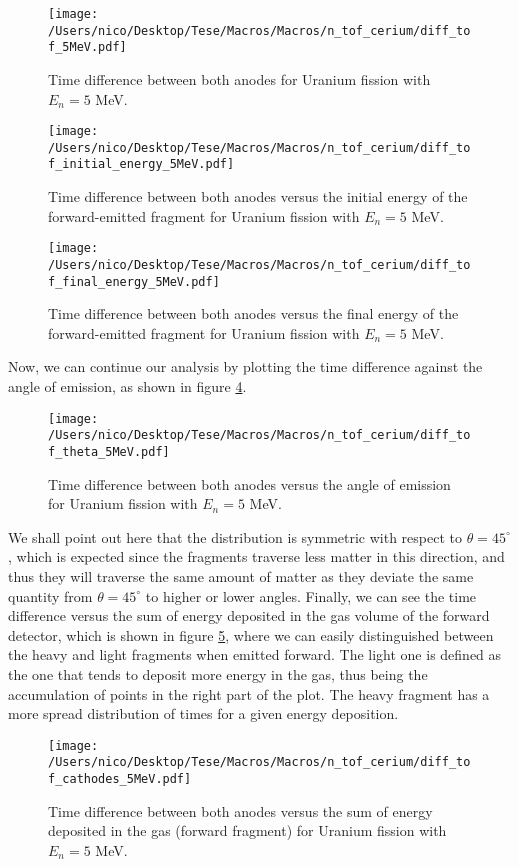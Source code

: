 \documentclass{article}
\begin{document}
\begin{figure}[H]
    \centering
    \texttt{[image: /Users/nico/Desktop/Tese/Macros/Macros/n\_tof\_cerium/diff\_tof\_5MeV.pdf]}
    \caption{Time difference between both anodes for Uranium fission with $E_n=5$ MeV.}
    \label{fig:diff_tof_5MeV}
\end{figure}
\begin{figure}[H]
    \centering
    \texttt{[image: /Users/nico/Desktop/Tese/Macros/Macros/n\_tof\_cerium/diff\_tof\_initial\_energy\_5MeV.pdf]}
    \caption{Time difference between both anodes versus the initial energy of the forward-emitted fragment for Uranium fission with $E_n=5$ MeV.}
    \label{fig:time_diff_initial_energy_5MeV}
\end{figure}
\begin{figure}
    \centering
    \texttt{[image: /Users/nico/Desktop/Tese/Macros/Macros/n\_tof\_cerium/diff\_tof\_final\_energy\_5MeV.pdf]}
    \caption{Time difference between both anodes versus the final energy of the forward-emitted fragment for Uranium fission with $E_n=5$ MeV.}
    \label{fig:time_diff_final_energy_5MeV}
\end{figure}
Now, we can continue our analysis by plotting the time difference against the angle of emission, as shown in figure \ref{fig:time_diff_costheta_5MeV}.
\begin{figure}[H]
    \centering
    \texttt{[image: /Users/nico/Desktop/Tese/Macros/Macros/n\_tof\_cerium/diff\_tof\_theta\_5MeV.pdf]}
    \caption{Time difference between both anodes versus the angle of emission for Uranium fission with $E_n=5$ MeV.}
    \label{fig:time_diff_costheta_5MeV}
\end{figure}
We shall point out here that the distribution is symmetric with respect to $\theta=45^{\circ}$, which is expected since the fragments traverse less matter in this direction, and thus they will traverse the same amount of matter as they deviate the same quantity from $\theta=45^{\circ}$ to higher or lower angles.
Finally, we can see the time difference versus the sum of energy deposited in the gas volume of the forward detector, which is shown in figure \ref{fig:time_diff_energy_5MeV}, where we can easily distinguished between the heavy and light fragments when emitted forward. The light one is defined as the one that tends to deposit more energy in the gas, thus being the accumulation of points in the right part of the plot. The heavy fragment has a more spread distribution of times for a given energy deposition.
\begin{figure}[H]
    \centering
    \texttt{[image: /Users/nico/Desktop/Tese/Macros/Macros/n\_tof\_cerium/diff\_tof\_cathodes\_5MeV.pdf]}
    \caption{Time difference between both anodes versus the sum of energy deposited in the gas (forward fragment) for Uranium fission with $E_n=5$ MeV.}
    \label{fig:time_diff_energy_5MeV}
\end{figure}
\end{document}
